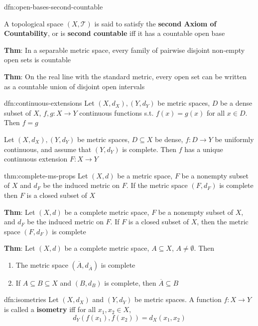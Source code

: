 \documentclass[landscape, 8pt]{extarticle}
\begin{document}
\begin{multicols}{3}
\begin{dfn}{dfn:open-bases-second-countable}{}

    A topological space $(X, \mathcal{T})$ is said to satisfy the \textbf{second Axiom of Countability}, or is \textbf{second countable} iff it has a countable open base

    \longrule{0.08ex}
    \textbf{Thm}: In a separable metric space, every family of pairwise disjoint non-empty open sets is countable

    \longrule{0.08ex}
    \textbf{Thm}: On the real line with the standard metric, every open set can be written as a countable union of disjoint open intervals
\end{dfn}

\begin{dfn}{dfn:continuous-extensions}{}
    Let $(X, d_{X}), (Y, d_{Y})$ be metric spaces, $D$ be a dense subset of $X$, $f, g : X \to Y$ continuous functions s.t. $f(x) = g(x)$ for all $x\in D$. Then $f = g$

    \longrule{0.08ex}
    Let $(X, d_{X}), (Y, d_{Y})$ be metric spaces, $D \subseteq X$ be dense, $f : D \to Y$ be uniformly continuous, and assume that $(Y, d_{Y})$ is complete. Then $f$ has a unique continuous extension $F : X \to Y$
\end{dfn}

\begin{thm}{thm:complete-ms-props}{}
    Let $(X, d)$ be a metric space, $F$ be a nonempty subset of $X$ and $d_{F}$ be the induced metric on $F$. If the metric space $(F, d_{F})$ is complete then $F$ is a closed subset of $X$

    \longrule{0.08ex}
    \textbf{Thm}: Let $(X, d)$ be a complete metric space, $F$ be a nonempty subset of $X$, and $d_{F}$ be the induced metric on $F$. If $F$ is a closed subset of $X$, then the metric space $(F, d_{F})$ is complete

    \longrule{0.08ex}
    \textbf{Thm}: Let $(X, d)$ be a complete metric space, $A \subseteq X$, $A \ne \emptyset$. Then
    \begin{enumerate}
        \item The metric space $(\overline{A}, d_{\overline{A}})$ is complete
        \item If $A \subseteq B \subseteq X$ and $(B, d_{B})$ is complete, then $\overline{A} \subseteq B$
    \end{enumerate}
\end{thm}

\begin{dfn}[Isometries]{dfn:isometries}{}
    Let $(X, d_{X})$ and $(Y, d_{Y})$ be metric spaces. A function $f : X \to Y$ is called a \textbf{isometry} iff for all $x_{1}, x_{2}\in X$,
    \[d_{Y}(f(x_{1}), f(x_{2})) = d_{X}(x_{1}, x_{2})\]


\end{dfn}
\end{multicols}
\end{document}
